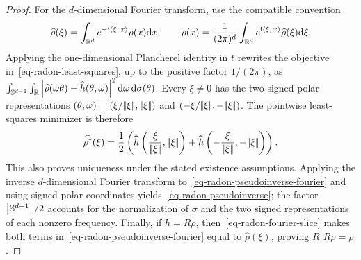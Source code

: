 \begin{proof}
	For the $d$-dimensional Fourier transform, use the compatible convention
	\[
		\widehat\rho(\xi)
		=
		\int_{\mathbb{R}^d}e^{-\mathrm{i}\langle \xi,\,x\rangle}\rho(x)\mathrm{d} x,
		\qquad
		\rho(x)
		=
		\frac{1}{(2\pi)^d}\int_{\mathbb{R}^d}e^{\mathrm{i}\langle \xi,\,x\rangle}\widehat\rho(\xi)\mathrm{d}\xi.
	\]
	Applying the one-dimensional Plancherel identity in $t$ rewrites the objective in~\eqref{eq-radon-least-squares}, up to the positive factor $1/(2\pi)$, as
	$\int_{\mathbb{S}^{d-1}}\int_{\mathbb{R}} \left\lvert\widehat\rho(\omega\theta)-\widehat h(\theta,\omega)\right\rvert^2 \mathrm{d}\omega\,\mathrm{d}\sigma(\theta)$.
	Every $\xi\neq0$ has the two signed-polar representations
	$(\theta,\omega)=(\xi/|\!| \xi |\!|,|\!| \xi |\!|)$ and
	$(-\xi/|\!| \xi |\!|,-|\!| \xi |\!|)$. The pointwise least-squares minimizer is therefore
	\begin{equation}\label{eq-radon-pseudoinverse-fourier}
		\widehat{\rho^\dagger}(\xi)=\frac12\left(\widehat h\left(\frac{\xi}{\norm{\xi}},\norm{\xi}\right)+\widehat h\left(-\frac{\xi}{\norm{\xi}},-\norm{\xi}\right)\right).
	\end{equation}
	This also proves uniqueness under the stated existence assumptions. Applying the inverse $d$-dimensional Fourier transform to~\eqref{eq-radon-pseudoinverse-fourier} and using signed polar coordinates yields~\eqref{eq-radon-pseudoinverse}; the factor $\left\lvert\mathbb{S}^{d-1}\right\rvert/2$ accounts for the normalization of $\sigma$ and the two signed representations of each nonzero frequency. Finally, if $h=R\rho$, then~\eqref{eq-radon-fourier-slice} makes both terms in~\eqref{eq-radon-pseudoinverse-fourier} equal to $\widehat\rho(\xi)$, proving $R^\dagger R\rho=\rho$.
\end{proof}


